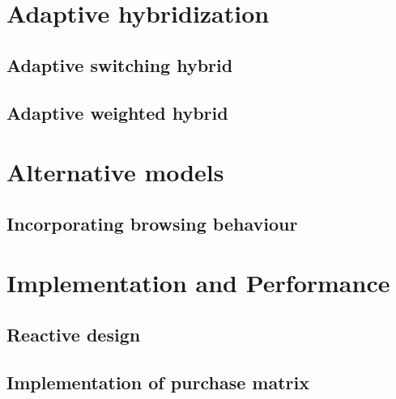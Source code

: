 \documentclass[10pt]{reportMaster}
\begin{document}
\chapter{Adaptive hybridization}

\section{Adaptive switching hybrid}


\section{Adaptive weighted hybrid}







\chapter{Alternative models}

\section{Incorporating browsing behaviour}






\chapter{Implementation and Performance}

\section{Reactive design}

\section{Implementation of purchase matrix}
\end{document}
